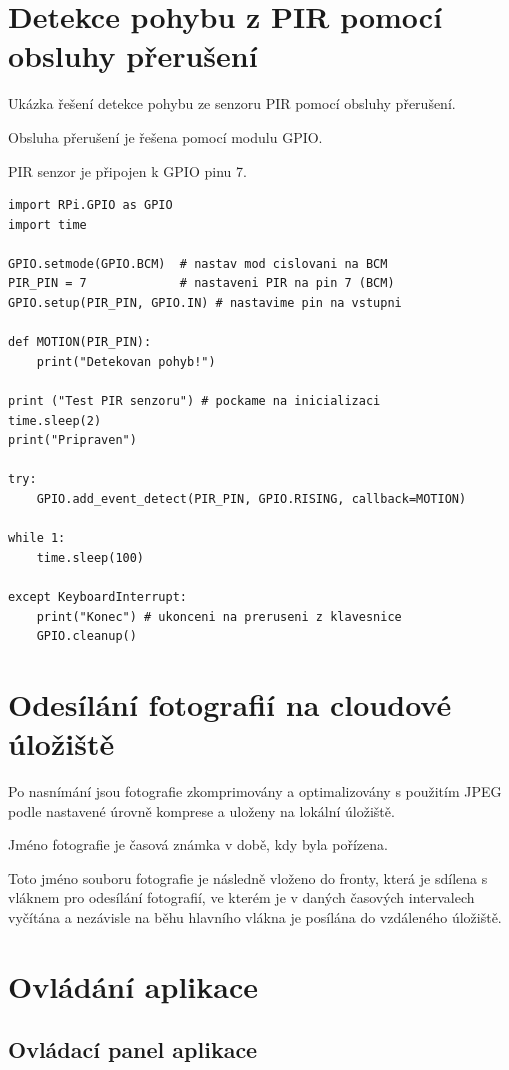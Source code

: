 \clearpage
\section{Detekce pohybu z PIR pomocí obsluhy přerušení}
Ukázka řešení detekce pohybu ze senzoru PIR pomocí obsluhy přerušení.

Obsluha přerušení je řešena pomocí modulu GPIO.

PIR senzor je připojen k GPIO pinu 7.

\begin{verbatim}
import RPi.GPIO as GPIO
import time

GPIO.setmode(GPIO.BCM)  # nastav mod cislovani na BCM
PIR_PIN = 7             # nastaveni PIR na pin 7 (BCM)
GPIO.setup(PIR_PIN, GPIO.IN) # nastavime pin na vstupni

def MOTION(PIR_PIN):
    print("Detekovan pohyb!")

print ("Test PIR senzoru") # pockame na inicializaci
time.sleep(2)
print("Pripraven")

try:
    GPIO.add_event_detect(PIR_PIN, GPIO.RISING, callback=MOTION) 

while 1:
    time.sleep(100)

except KeyboardInterrupt:
    print("Konec") # ukonceni na preruseni z klavesnice
    GPIO.cleanup()

\end{verbatim}

\clearpage

\section*{Odesílání fotografií na cloudové úložiště}
Po nasnímání jsou fotografie zkomprimovány a optimalizovány s použitím JPEG podle nastavené úrovně komprese a uloženy na lokální úložiště.

Jméno fotografie je časová známka v době, kdy byla pořízena.

Toto jméno souboru fotografie je následně vloženo do fronty, která je sdílena s vláknem pro odesílání fotografií, ve kterém je v daných časových intervalech vyčítána a nezávisle na běhu hlavního vlákna je posílána do vzdáleného úložiště.

\section{Ovládání aplikace}

\subsection*{Ovládací panel aplikace}

